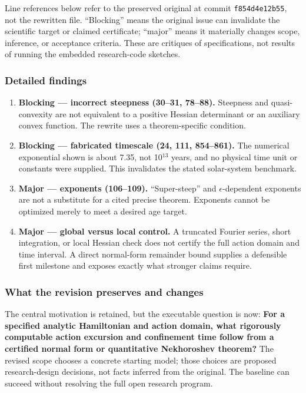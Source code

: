 \documentclass[
  11pt,
]{article}
\begin{document}
Line references below refer to the preserved original at commit
\texttt{f854d4e12b55}, not the rewritten file. ``Blocking'' means the
original issue can invalidate the scientific target or claimed
certificate; ``major'' means it materially changes scope, inference, or
acceptance criteria. These are critiques of specifications, not results
of running the embedded research-code sketches.

\subsubsection{Detailed findings}

\begin{enumerate}
\def\labelenumi{\arabic{enumi}.}
\item
  \textbf{Blocking --- incorrect steepness (30--31, 78--88).} Steepness
  and quasi-convexity are not equivalent to a positive Hessian
  determinant or an auxiliary convex function. The rewrite uses a
  theorem-specific condition.
\item
  \textbf{Blocking --- fabricated timescale (24, 111, 854--861).} The
  numerical exponential shown is about 7.35, not 10\ensuremath{{}^{13}}
  years, and no physical time unit or constants were supplied. This
  invalidates the stated solar-system benchmark.
\item
  \textbf{Major --- exponents (106--109).} ``Super-steep'' and
  \ensuremath{\epsilon}-dependent exponents are not a substitute for a
  cited precise theorem. Exponents cannot be optimized merely to meet a
  desired age target.
\item
  \textbf{Major --- global versus local control.} A truncated Fourier
  series, short integration, or local Hessian check does not certify the
  full action domain and time interval. A direct normal-form remainder
  bound supplies a defensible first milestone and exposes exactly what
  stronger claims require.
\end{enumerate}

\subsubsection{What the revision preserves and changes}

The central motivation is retained, but the executable question is now:
\textbf{For a specified analytic Hamiltonian and action domain, what
rigorously computable action excursion and confinement time follow from
a certified normal form or quantitative Nekhoroshev theorem?} The
revised scope chooses a concrete starting model; those choices are
proposed research-design decisions, not facts inferred from the
original. The baseline can succeed without resolving the full open
research program.
\end{document}
